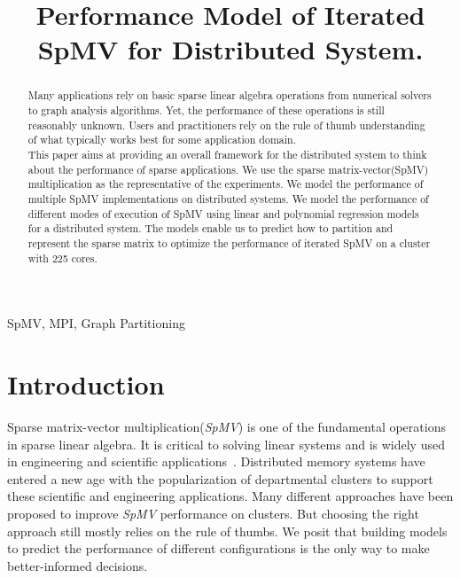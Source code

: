 \documentclass[conference, 10ppt]{IEEEtran}
\begin{document}
%
\newcommand{\todo}[1]{\color{red}\textbf{\hl{#1}}\color{black}\xspace}
\newcommand{\rom}[1]{\expandafter{\romannumeral #1\relax}}
%
\title{Performance Model of Iterated SpMV for Distributed System.}

\author{
\and
{}
}
%
\maketitle

\begin{abstract}
Many applications rely on basic sparse linear algebra operations from numerical solvers to graph analysis 
algorithms. Yet, the performance of these operations is still reasonably unknown. Users and practitioners 
rely on the rule of thumb understanding of what typically works best for some application domain.
\\ 
This paper aims at providing an overall framework for the distributed system to think about the performance 
of sparse applications. We use the sparse matrix-vector(SpMV) multiplication as the representative of the 
experiments. We model the performance of multiple SpMV implementations on distributed systems. 
 We model the performance of different modes of execution of SpMV using linear and polynomial regression models for a distributed system. 
 The models enable us to predict how to partition and represent the sparse matrix to optimize the performance of iterated SpMV on a cluster with 225 cores.
\end{abstract}
%

\begin{IEEEkeywords}
SpMV, MPI, Graph Partitioning
\end{IEEEkeywords}

\section{Introduction}
Sparse matrix-vector multiplication(\textit{SpMV}) is one of the
fundamental operations in sparse linear algebra. It is critical to
solving linear systems and is widely used in engineering and scientific
applications~\cite{gleich2015pagerank, saad2003iterative, dytrych2016efficacy}. 
Distributed memory systems have entered a new age with
the popularization of departmental clusters to support these
scientific and engineering applications.  Many different approaches
have been proposed to improve \textit{SpMV} performance on
clusters. But choosing the right approach still mostly relies on the rule
of thumbs. We posit that building models to predict the performance of
different configurations is the only way to make better-informed
decisions.
\end{document}
